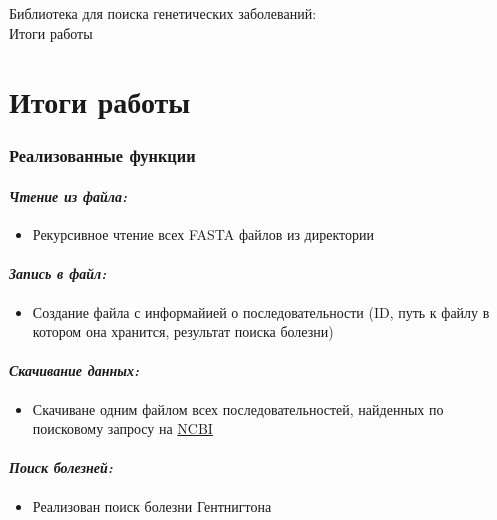 \documentclass{article}
\begin{document}
    \begin{titlepage}
        \newpage
            \begin{center}
                \Large Библиотека для поиска генетических заболеваний:\\
                Итоги работы
            \end{center}
    \end{titlepage}
    
    \part{Итоги работы}
        \section{Реализованные функции}
            \subsection{\emph{Чтение из файла:}}
            	\begin{itemize}
            		\item Рекурсивное чтение всех FASTA файлов из директории
            	\end{itemize}
             \subsection{\emph{Запись в файл:}}
             	\begin{itemize}
             		\item Создание файла с информайией о последовательности (ID, путь к файлу в котором она хранится, результат поиска болезни) 
             	\end{itemize}
            \subsection{\emph{Скачивание данных:}}
            	\begin{itemize}
            		\item Скачиване одним файлом всех последовательностей, найденных по поисковому запросу на \href{https://www.ncbi.nlm.nih.gov/nuccore}{NCBI}
            	\end{itemize}
             \subsection{\emph{Поиск болезней:}}
             	\begin{itemize}
             		\item Реализован поиск болезни Гентнигтона 
             	\end{itemize}
\end{document}
